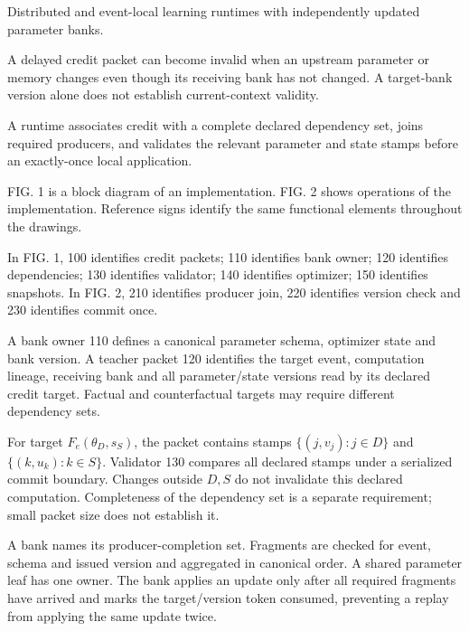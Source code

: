 \documentclass[pct]{sm-patent}
\begin{document}
\descriptionstart


\pnum Distributed and event-local learning runtimes with independently updated parameter banks.


\pnum A delayed credit packet can become invalid when an upstream parameter or memory changes even though its receiving bank has not changed. A target-bank version alone does not establish current-context validity.


\pnum A runtime associates credit with a complete declared dependency set, joins required producers, and validates the relevant parameter and state stamps before an exactly-once local application.


\pnum FIG. 1 is a block diagram of an implementation. FIG. 2 shows operations of the implementation. Reference signs identify the same functional elements throughout the drawings.


\pnum In FIG. 1, 100 identifies credit packets; 110 identifies bank owner; 120 identifies dependencies; 130 identifies validator; 140 identifies optimizer; 150 identifies snapshots. In FIG. 2, 210 identifies producer join, 220 identifies version check and 230 identifies commit once.

\pnum A bank owner 110 defines a canonical parameter schema, optimizer state and bank version. A teacher packet 120 identifies the target event, computation lineage, receiving bank and all parameter/state versions read by its declared credit target. Factual and counterfactual targets may require different dependency sets.

\pnum For target $F_e(\theta_D,s_S)$, the packet contains stamps $\{(j,v_j):j\in D\}$ and $\{(k,u_k):k\in S\}$. Validator 130 compares all declared stamps under a serialized commit boundary. Changes outside $D,S$ do not invalidate this declared computation. Completeness of the dependency set is a separate requirement; small packet size does not establish it.

\pnum A bank names its producer-completion set. Fragments are checked for event, schema and issued version and aggregated in canonical order. A shared parameter leaf has one owner. The bank applies an update only after all required fragments have arrived and marks the target/version token consumed, preventing a replay from applying the same update twice.
\end{document}
